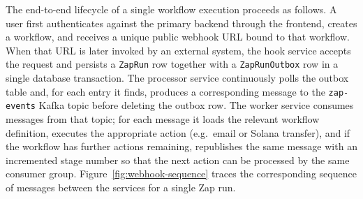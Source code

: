 The end-to-end lifecycle of a single workflow execution proceeds as follows. A user first authenticates against the primary backend through the frontend, creates a workflow, and receives a unique public webhook URL bound to that workflow. When that URL is later invoked by an external system, the hook service accepts the request and persists a \texttt{ZapRun} row together with a \texttt{ZapRunOutbox} row in a single database transaction. The processor service continuously polls the outbox table and, for each entry it finds, produces a corresponding message to the \texttt{zap-events} Kafka topic before deleting the outbox row. The worker service consumes messages from that topic; for each message it loads the relevant workflow definition, executes the appropriate action (e.g.\ email or Solana transfer), and if the workflow has further actions remaining, republishes the same message with an incremented stage number so that the next action can be processed by the same consumer group. Figure~\ref{fig:webhook-sequence} traces the corresponding sequence of messages between the services for a single Zap run.

